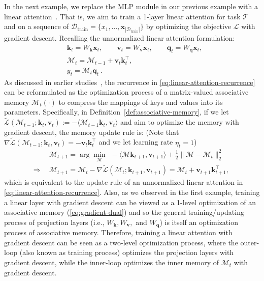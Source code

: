 \documentclass{article}
\newcommand{\vv}{\mathbf{v}}
\newcommand{\citep}{\parencite}
\newcommand{\inner}[2]{\langle #1, #2 \rangle}
\newcommand{\M}[0]{\mathcal{M}}
\newcommand{\head}[1]{\vspace{1.7mm}\noindent{{\textcolor{c4}{\bf #1.}}}}
\newcommand{\vk}{\boldsymbol{k}}
\newcommand{\vq}{\boldsymbol{q}}
\renewcommand{\vv}{\boldsymbol{v}}
\begin{document}
\head{An Example of Architectural Decomposition}
In the next example, we replace the MLP module in our previous example with a linear attention~\citep{katharopoulos2020transformers}. That is, we aim to train a 1-layer linear attention for task $\mathcal{T}$ and on a sequence of $\mathcal{D}_{\text{train}} = \{x_1, \dots, \boldsymbol{x}_{|\mathcal{D}_{\text{train}}|}\}$ by optimizing the objective $\mathcal{L}$ with gradient descent. Recalling the unnormalized linear attention formulation: 
\begin{align}\label{eq:linear-attn-projection}
    & \vk_t =  W_{\vk} \boldsymbol{x}_t , \qquad \vv_t =  W_{\vv} \boldsymbol{x}_t, \qquad \vq_t =  W_{\vq}\boldsymbol{x}_t,   \\ \label{eq:linear-attention-recurrence}
    &\M_{t} = \M_{t-1} + \vv_t \vk_t^{\top}, \\ \label{eq:linear-attn-output}
    &y_t = \M_t \vq_t \:.
\end{align}
As discussed in earlier studies~\citep{liu2024longhorn, behrouz2025Miras}, the recurrence in \autoref{eq:linear-attention-recurrence} can be reformulated as the optimization process of a matrix-valued associative memory $\M_t(\cdot)$ to compress the mappings of keys and values into its parameters. Specifically, in Definition~\ref{def:associative-memory}, if we let $\tilde{\mathcal{L}}(\M_{t-1}; \vk_t, \vv_t) := - \inner{\M_{t-1} \vk_t}{\vv_t}$ and aim to optimize the memory with gradient descent, the memory update rule is: (Note that $\nabla \tilde{\mathcal{L}}(\M_{t-1}; \vk_t, \vv_t) = - \vv_t \vk_t^{\top}$ and we let learning rate $\eta_{t} = 1$)    
\begin{align}\label{eq:linear-attention-optimization}
    &\M_{t+1} = \arg \min_{\M} \:\: - \inner{\M \vk_{t+1}}{\vv_{t+1}} + \frac{1}{2}\| \M - \M_{t} \|^2_2 \quad  \\ 
    \Rightarrow \:\: &\M_{t+1} = \M_t - \nabla \tilde{\mathcal{L}}(\M_t; \vk_{t+1}, \vv_{t+1}) = \M_t + \vv_{t+1} \vk_{t+1}^{\top},
\end{align}
which is equivalent to the update rule of an unnormalized linear attention in \autoref{eq:linear-attention-recurrence}. Also, as we observed in the first example, training a linear layer with gradient descent can be viewed as a 1-level optimization of an associative memory (\autoref{eq:gradient-dual}) and so the general training/updating process of projection layers  (i.e., $W_{\vk}, W_{\vv},$ and $W_{\vq}$) is itself an optimization process of associative memory. Therefore, training a linear attention with gradient descent can be seen as a two-level optimization process, where the outer-loop (also known as training process) optimizes the projection layers with gradient descent, while the inner-loop optimizes the inner memory of $\M_t$ with gradient descent. 
\end{document}
